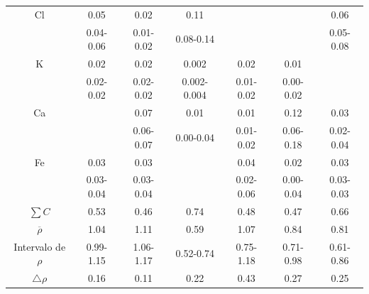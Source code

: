 \begin{table}
\begin{tabular}{|c|c|c|c|c|c|c|}
\rowcolor{Blue1}	Cl	&	0.05	&	0.02	&	0.11	&		&		&	0.06	\\ 		
\rowcolor{Blue1}		&	0.04-0.06	&	0.01-0.02	&	0.08-0.14	&		&		&	0.05-0.08	\\ 	\hline	
\rowcolor{Blue1}	K	&	0.02	&	0.02	&	0.002	&	0.02	&	0.01	&		\\ 		
\rowcolor{Blue1}		&	0.02-0.02	&	0.02-0.02	&	0.002-0.004	&	0.01-0.02	&	0.00-0.02	&		\\ 	\hline	
\rowcolor{Blue1}	Ca	&		&	0.07	&	0.01	&	0.01	&	0.12	&	0.03	\\ 		
\rowcolor{Blue1}		&		&	0.06-0.07	&	0.00-0.04	&	0.01-0.02	&	0.06-0.18	&	0.02-0.04	\\ 	\hline	
\rowcolor{Blue1}	Fe	&	0.03	&	0.03	&		&	0.04	&	0.02	&	0.03	\\ 		
\rowcolor{Blue1}		&	0.03-0.04	&	0.03-0.04	&		&	0.02-0.06	&	0.00-0.04	&	0.03-0.03	\\ 	\hline	\hline
\rowcolor{Blue2}	$\sum C$	&	0.53	&	0.46	&	0.74	&	0.48	&	0.47	&	0.66	\\ 	\hline	\hline
\rowcolor{Blue2}	$\overline{\rho}$	&	1.04	&	1.11	&	0.59	&	1.07	&	0.84	&	0.81	\\ 
\rowcolor{Blue2}	Intervalo de $\rho$	&	0.99-1.15	&	1.06-1.17	&	0.52-0.74	&	0.75-1.18	&	0.71-0.98	&	0.61-0.86	\\ 	
\rowcolor{Blue2}	 $\bigtriangleup \rho$ & 0.16	&	0.11	&	0.22	&	0.43	&	0.27	&	0.25 \\ \hline
\end{tabular}
\end{table}
